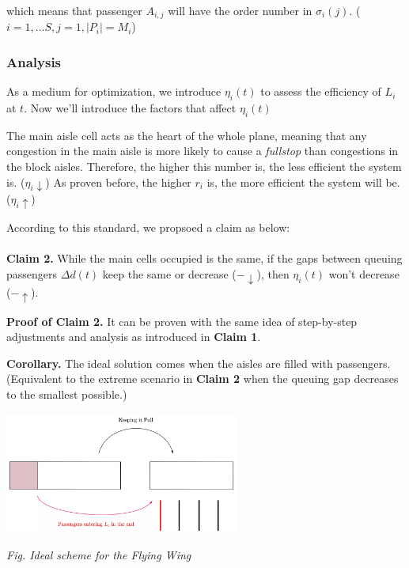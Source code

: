 \documentclass{article}
\theoremstyle{definition}
\theoremstyle{remark}
\numberwithin{equation}{section}
\begin{document}
	which means that passenger $A_{i,j}$ will have the order number in $\sigma_i (j)$. ($i=1,...S, j=1, \left|P_i \right|=M_i$)

	\subsubsection{Analysis}
	As a medium for optimization, we introduce $\eta_i (t)$ to assess the efficiency of $L_i$ at $t$. Now we'll introduce the factors that affect \(\eta_i (t)\)
	\begin{itemize}
			The main aisle cell acts as the heart of the whole plane, meaning that any congestion in the main aisle is more likely to cause a \textit{fullstop} than congestions in the block aisles. Therefore, the higher this number is, the less efficient the system is. (\(\eta_i \downarrow\))
			As proven before, the higher \(r_i\) is, the more efficient the system will be. (\(\eta_i \uparrow\))
	\end{itemize}

	According to this standard, we propsoed a claim as below: \\ \\

	\textbf{Claim 2.} While the main cells occupied is the same, if the gaps between queuing passengers \(\Delta d(t)\) keep the same or decrease (\(-\downarrow\)), then \(\eta_i(t)\) won't decrease (\(-\uparrow\)).

	\textbf{Proof of Claim 2.} It can be proven with the same idea of step-by-step adjustments and analysis as introduced in \textbf{Claim 1}.

	\textbf{Corollary.} The ideal solution comes when the aisles are filled with passengers. (Equivalent to the extreme scenario in \textbf{Claim 2} when the queuing gap decreases to the smallest possible.)

	\begin{center}
		\includegraphics[height = 4cm]{fw scheme.jpg}

		\small\textit{Fig. Ideal scheme for the Flying Wing}
	\end{center}
\end{document}
